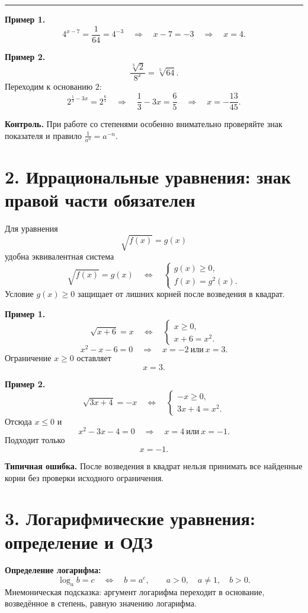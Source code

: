 \documentclass[a4paper,12pt]{article}
\newcommand{\key}[1]{\textcolor{darkaccent}{\textbf{#1}}}
\newcommand{\ruleline}{\par\vspace{0.3em}\noindent\textcolor{linegray}{\rule{\linewidth}{0.5pt}}\par\vspace{0.35em}}
\begin{document}
\ruleline
\textbf{Пример 1.}
\[
4^{x-7}=\frac1{64}=4^{-3}
\quad\Longrightarrow\quad
x-7=-3
\quad\Longrightarrow\quad
\boxed{x=4}.
\]

\textbf{Пример 2.}
\[
\frac{\sqrt[3]{2}}{8^x}=\sqrt[5]{64}.
\]
Переходим к основанию $2$:
\[
2^{\frac13-3x}=2^{\frac65}
\quad\Longrightarrow\quad
\frac13-3x=\frac65
\quad\Longrightarrow\quad
\boxed{x=-\frac{13}{45}}.
\]

\key{Контроль.} При работе со степенями особенно внимательно проверяйте знак показателя и правило
$\frac1{a^n}=a^{-n}$.

\section{2. Иррациональные уравнения: знак правой части обязателен}

Для уравнения
\[
\sqrt{f(x)}=g(x)
\]
удобна эквивалентная система
\[
\boxed{
\sqrt{f(x)}=g(x)
\quad\Longleftrightarrow\quad
\begin{cases}
 g(x)\ge0,\\
 f(x)=g^2(x).
\end{cases}}
\]
Условие $g(x)\ge0$ защищает от лишних корней после возведения в квадрат.

\textbf{Пример 1.}
\[
\sqrt{x+6}=x
\quad\Longleftrightarrow\quad
\begin{cases}
 x\ge0,\\
 x+6=x^2.
\end{cases}
\]
\[
x^2-x-6=0
\quad\Longrightarrow\quad
x=-2\ \text{или}\ x=3.
\]
Ограничение $x\ge0$ оставляет
\[
\boxed{x=3}.
\]

\textbf{Пример 2.}
\[
\sqrt{3x+4}=-x
\quad\Longleftrightarrow\quad
\begin{cases}
 -x\ge0,\\
 3x+4=x^2.
\end{cases}
\]
Отсюда $x\le0$ и
\[
x^2-3x-4=0
\quad\Longrightarrow\quad
x=4\ \text{или}\ x=-1.
\]
Подходит только
\[
\boxed{x=-1}.
\]

\key{Типичная ошибка.} После возведения в квадрат нельзя принимать все найденные корни без проверки исходного ограничения.

\section{3. Логарифмические уравнения: определение и ОДЗ}

\key{Определение логарифма:}
\[
\boxed{\log_a b=c\quad\Longleftrightarrow\quad b=a^c},
\qquad
a>0,\quad a\ne1,\quad b>0.
\]
Мнемоническая подсказка: аргумент логарифма переходит в основание, возведённое в степень, равную значению логарифма.
\end{document}
